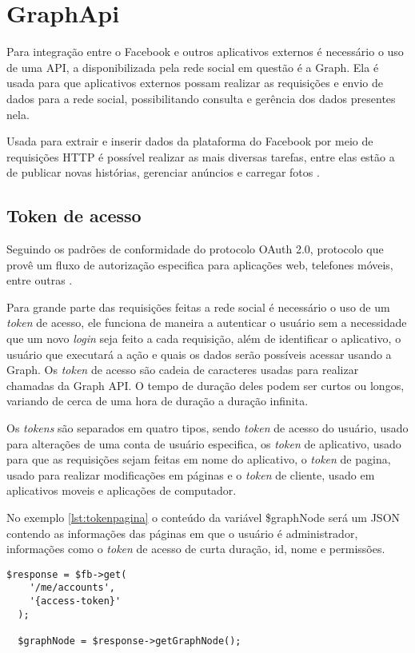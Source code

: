 \chapter[GraphApi]{GraphApi}
Para integração entre o Facebook e outros aplicativos externos é necessário o uso de uma API, a disponibilizada pela rede social em questão é a Graph. Ela é usada para que aplicativos externos possam realizar as requisições e envio de dados para a rede social, possibilitando consulta e gerência dos dados presentes nela. 

Usada para extrair e inserir dados da plataforma do Facebook por meio de requisições HTTP é possível realizar as mais diversas tarefas, entre elas estão a de publicar novas histórias, gerenciar anúncios e carregar fotos \cite{facebook2018b}.

\section{Token de acesso}
Seguindo os padrões de conformidade do protocolo OAuth 2.0, protocolo que provê um fluxo de autorização especifica para aplicações web, telefones móveis, entre outras \cite{oauth2018}. 

Para grande parte das requisições feitas a rede social é necessário o uso de um \textit{token} de acesso, ele funciona de maneira a autenticar o usuário sem a necessidade que um novo \textit{login} seja feito a cada requisição, além de identificar o aplicativo, o usuário que executará a ação e quais os dados serão possíveis acessar usando a Graph. Os \textit{token} de acesso são cadeia de caracteres usadas para realizar chamadas da Graph API. O tempo de duração deles podem ser curtos ou longos, variando de cerca de uma hora de duração a duração infinita.

Os \textit{tokens} são separados em quatro tipos, sendo \textit{token} de acesso do usuário, usado para alterações de uma conta de usuário especifica, os  \textit{token} de aplicativo, usado para que as requisições sejam feitas em nome do aplicativo, o \textit{token} de pagina, usado para realizar modificações em páginas e o \textit{token} de cliente, usado em aplicativos moveis e aplicações de computador.

No exemplo \ref{lst:tokenpagina} o conteúdo da variável \$graphNode será um JSON contendo as informações das páginas em que o usuário é administrador, informações como o \textit{token} de acesso de curta duração, id, nome e permissões. 

\begin{lstlisting}[caption={Obtendo Token de acesso a página},label={lst:tokenpagina}]
  $response = $fb->get(
    '/me/accounts',
    '{access-token}'
  );
  
  $graphNode = $response->getGraphNode();
\end{lstlisting}

